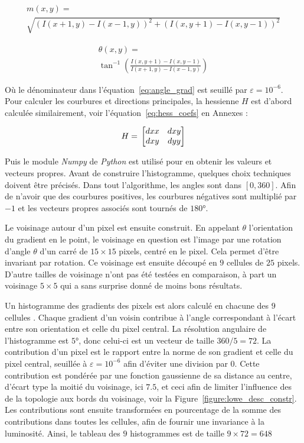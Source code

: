 \documentclass[
	a4paper, %
	10pt, %
	unnumberedsections, %
	twoside, %
]{LTJournalArticle}
\begin{document}
\begin{multline}
	m(x, y) = \\
	\sqrt{(I(x+1, y) - I(x-1,y))^2 + (I(x,y+1)-I(x,y-1))^2}
\end{multline}

\begin{multline} \label{eq:angle_grad}
	\theta(x, y) = \\
	\tan^{-1}\left(\frac{I(x,y+1)-I(x,y-1)}{I(x+1, y) - I(x-1,y)}\right)
\end{multline}


Où le dénominateur dans l'équation~\ref{eq:angle_grad} est seuillé par $\varepsilon = 10^{-6}$.
Pour calculer les courbures et directions principales, la hessienne $H$ est d'abord calculée
similairement, voir l'équation~\ref{eq:hess_coefs} en Annexes :

\begin{equation}
	H = \\
	\begin{bmatrix}
		dxx & dxy \\
		dxy & dyy
	\end{bmatrix}
\end{equation}

Puis le module \textit{Numpy} de \textit{Python} est utilisé pour en obtenir les valeurs et vecteurs
propres.
Avant de construire l'histogramme, quelques choix techniques doivent être précisés.
Dans tout l'algorithme, les angles sont dans $[0, 360]$. Afin de n'avoir que des
courbures positives, les courbures négatives sont multiplié par $-1$
et les vecteurs propres associés sont tournés de $180$°.

Le voisinage autour d'un pixel est ensuite construit. En appelant $\theta$
l'orientation du gradient en le point, le voisinage en question est l'image par
une rotation d'angle $\theta$ d'un carré de $15\times 15$ pixels,
centré en le pixel. Cela permet d'être invariant par rotation.
Ce voisinage est ensuite découpé en $9$ cellules de $25$ pixels.
D'autre tailles de voisinage n'ont pas été testées en comparaison, à
part un voisinage $5 \times 5$ qui a sans surprise donné de moins bons résultats.

Un histogramme des gradients des pixels est alors calculé en chacune des $9$ cellules .
Chaque gradient d'un voisin contribue à
l'angle correspondant à l'écart entre son orientation et celle du pixel central.
La résolution angulaire de l'histogramme est $5$°, donc celui-ci est un vecteur de taille
$360 / 5 = 72$.
La contribution d'un pixel
est le rapport entre la norme de son gradient et celle du pixel central,
seuillée à $\varepsilon = 10^{-6}$ afin d'éviter une division par $0$.
Cette contribution est pondérée par une fonction gaussienne de sa distance au centre,
d'écart type la moitié du voisinage, ici $7.5$, et ceci afin de limiter l'influence des
de la topologie aux bords du voisinage, voir la Figure~\ref{figure:lowe_desc_constr}.
Les contributions sont ensuite transformées en pourcentage
de la somme des contributions dans toutes les cellules, afin de fournir une invariance
à la luminosité. Ainsi, le tableau des $9$ histogrammes est de taille $9 \times 72 = 648$
\end{document}
